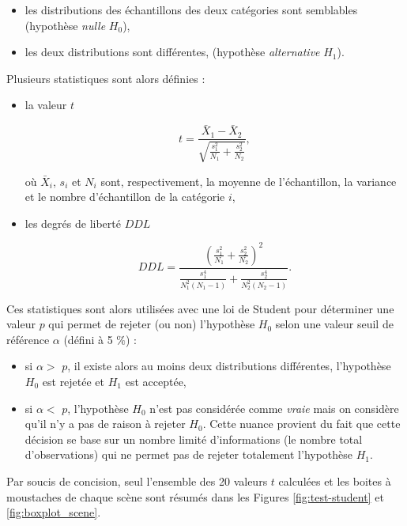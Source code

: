 \begin{itemize}
\item les distributions des échantillons des deux catégories sont semblables (hypothèse \textit{nulle} $H_0$),
\item les deux distributions sont différentes, (hypothèse \textit{alternative} $H_1$).\\
\end{itemize}

Plusieurs statistiques sont alors définies :
\begin{itemize}
\item la valeur $t$

\begin{equation}
t = \frac{\bar{X}_1-\bar{X}_2}{\sqrt{\frac{s_1^2}{N_1}+\frac{s_2^2}{N_2}}},
\end{equation}

où $\bar{X}_i$, $s_i$ et $N_i$ sont, respectivement, la moyenne de l'échantillon, la variance et le nombre d'échantillon de la catégorie $i$,
\item les degrés de liberté $DDL$

\begin{equation}
DDL = \frac{\left(\frac{s_1^2}{N_1}+\frac{s_2^2}{N_2} \right)^2}{\frac{s_1^4}{N_1^2(N_1-1)}+\frac{s_2^4}{N_2^2(N_2-1)}}.
\end{equation}

\end{itemize}

Ces statistiques sont alors utilisées avec une loi de Student pour déterminer une valeur $p$ qui permet de rejeter (ou non) l'hypothèse $H_0$ selon une valeur seuil de référence $\alpha$ (défini à 5 $\%$) :

\begin{itemize}
\item si $\alpha >$ $p$, il existe alors au moins deux distributions différentes, l'hypothèse $H_0$ est rejetée et $H_1$ est acceptée,
\item si $\alpha <$ $p$, l'hypothèse $H_0$ n'est pas considérée comme \textit{vraie} mais on considère qu'il n'y a pas de raison à rejeter $H_0$. Cette nuance provient du fait que cette décision se base sur un nombre limité d'informations (le nombre total d'observations) qui ne permet pas de rejeter totalement l'hypothèse $H_1$.\\
\end{itemize}

Par soucis de concision, seul l'ensemble des 20 valeurs $t$ calculées et les boites à moustaches de chaque scène sont résumés dans les Figures \ref{fig:test-student} et \ref{fig:boxplot_scene}.

